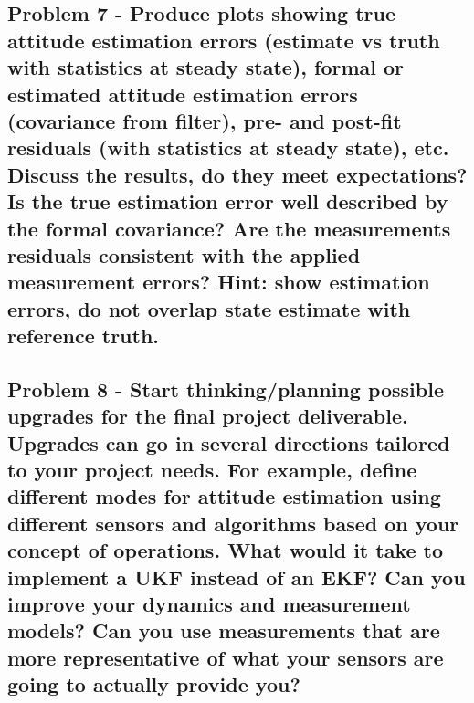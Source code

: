 \subsection{Problem 7 - Produce plots showing true attitude estimation errors (estimate vs truth with statistics at steady state), formal or estimated attitude estimation errors (covariance from filter), pre- and post-fit residuals (with statistics at steady state), etc. Discuss the results, do they meet expectations? Is the true estimation error well described by the formal covariance? Are the measurements residuals consistent with the applied measurement errors? Hint: show estimation errors, do not overlap state estimate with reference truth.}

\subsection{Problem 8 - Start thinking/planning possible upgrades for the final project deliverable. Upgrades can go in several directions tailored to your project needs. For example, define different modes for attitude estimation using different sensors and algorithms based on your concept of operations. What would it take to implement a UKF instead of an EKF? Can you improve your dynamics and measurement models? Can you use measurements that are more representative of what your sensors are going to actually provide you? }